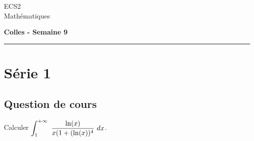\documentclass[11pt]{article}%
\begin{document}
\begin{flushleft}
ECS2 \\
Mathématiques
\end{flushleft}

\begin{center}
\textbf{\Large{Colles - Semaine 9}}
\end{center}

\hrule

\vspace*{0,2cm}

\section*{Série 1}
\subsection*{Question de cours}
\noindent
Calculer $\displaystyle \int_{1}^{+\infty}\  \dfrac{\ln(x)}{x(1+(\ln(x))^4} \ dx$.
\end{document}
